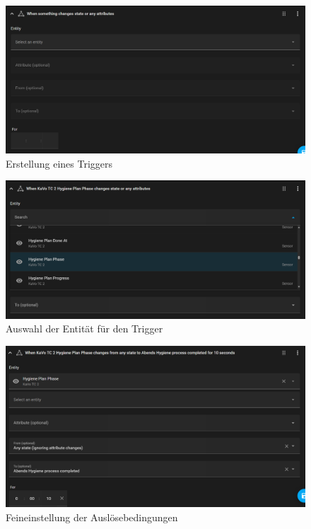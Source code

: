 \begin{figure}[H]
    \centering
    \includegraphics[width=\linewidth]{images/auto_trig1.png}
    \caption{Erstellung eines Triggers}
\end{figure}

\begin{figure}[H]
    \centering
    \includegraphics[width=\linewidth]{images/auto_trig2.png}
    \caption{Auswahl der Entität für den Trigger}
\end{figure}

\begin{figure}[H]
    \centering
    \includegraphics[width=\linewidth]{images/auto_trig3.png}
    \caption{Feineinstellung der Auslösebedingungen}
\end{figure}


